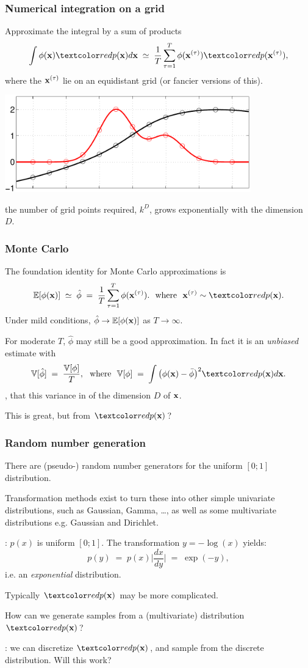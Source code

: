 \begin{frame}
\frametitle{Numerical integration on a grid}

Approximate the integral by a sum of products
\[
\int \phi(\bfx)\Red{p(\bfx)}d\bfx\;\simeq\;\frac{1}{T}\sum_{\tau=1}^T\phi(\bfx^{(\tau)})\Red{p(\bfx^{(\tau)})},
\]
where the $\mathbf x^{(\tau)}$ lie on an equidistant grid (or fancier
versions of this).
\begin{center}
\includegraphics[width=0.8\textwidth]{mc1}
\end{center}
 the number of grid points required, $k^D$, grows
exponentially with the dimension $D$.
\end{frame}

\begin{frame}
\frametitle{Monte Carlo}

The foundation identity for Monte Carlo approximations is
\[
\E[\phi(\bfx)]\;\simeq\;\hat\phi\;=\;\frac{1}{T}\sum_{\tau=1}^T\phi(\bfx^{(\tau)}).
\text{\ \ where\ \ }\bfx^{(\tau)}\sim \Red{p(\bfx)}.
\]
Under mild conditions, $\hat\phi\rightarrow\mathbb{E}[\phi(\mathbf x)]$ as
$T\rightarrow\infty$.

For moderate $T$, $\hat\phi$ may still be a good approximation. In
fact it is an \emph{unbiased} estimate with
\[
\V[\hat\phi]\;=\;\frac{\V[\phi]}{T}, \text{\ \ where\ \ }
\V[\phi]\;=\;\int \big(\phi(\bfx)-\bar\phi\big)^2\Red{p(\bfx)}d\bfx.
\]
, that this variance in  of the dimension
$D$ of $\mathbf x$.

This is great, but  from
$\Red{p(\bfx)}$?
\end{frame}

\begin{frame}
\frametitle{Random number generation}

There are (pseudo-) random number generators for the uniform $[0; 1]$
distribution.

Transformation methods exist to turn these into other simple
univariate distributions, such as Gaussian, Gamma, \ldots, as well as some
multivariate distributions e.g. Gaussian and Dirichlet.

: $p(x)$ is uniform $[0; 1]$. The transformation $y=-\log(x)$
yields:
\[
p(y)\;=\;p(x)\big|\frac{dx}{dy}\big|\;=\;\exp(-y),
\]
i.e. an \emph{exponential} distribution.

Typically $\Red{p(\bfx)}$ may be more complicated.

How can we generate samples from a (multivariate) distribution $\Red{p(\bfx)}$?

: we can discretize $\Red{p(\bfx)}$, and sample from the
discrete  distribution. Will this work?
\end{frame}

